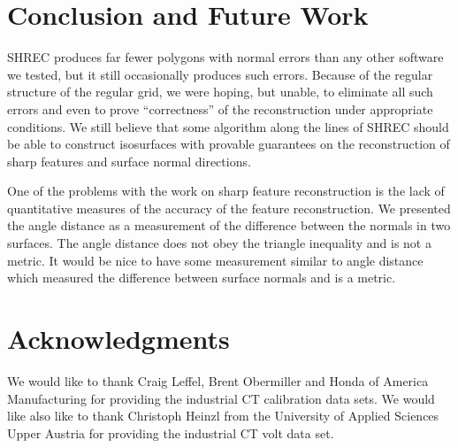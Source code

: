 
\section{Conclusion and Future Work}
\label{section:conclusion}

SHREC produces far fewer polygons with normal errors 
than any other software we tested,
but it still occasionally produces such errors.
Because of the regular structure of the regular grid,
we were hoping, but unable, to eliminate all such errors
and even to prove ``correctness'' of the reconstruction
under appropriate conditions.
We still believe that some algorithm along the lines of SHREC
should be able to construct isosurfaces with provable
guarantees on the reconstruction of sharp features
and surface normal directions.

One of the problems with the work on sharp feature reconstruction
is the lack of quantitative measures of the accuracy 
of the feature reconstruction.
We presented the angle distance as a measurement of the difference
between the normals in two surfaces.
The angle distance does not obey the triangle inequality
and is not a metric.
It would be nice to have some measurement similar to angle distance
which measured the difference between surface normals
and is a metric.


\section{Acknowledgments}

We would like to thank Craig Leffel, Brent Obermiller 
and Honda of America Manufacturing
for providing the industrial CT calibration data sets.
We would like also like to thank Christoph Heinzl
from the University of Applied Sciences Upper Austria
for providing the industrial CT volt data set.

